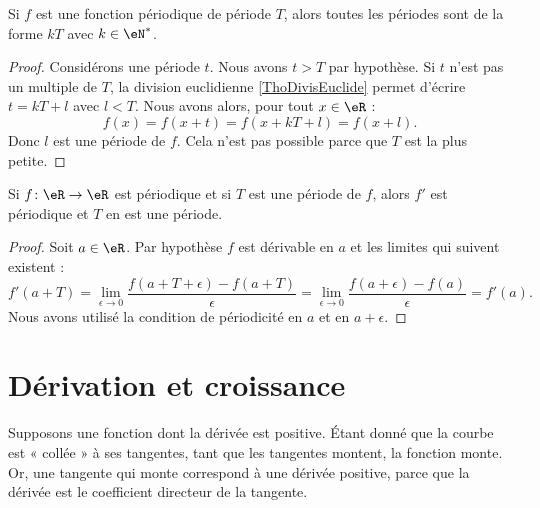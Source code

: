 \begin{lemma}        \label{LEMooOGFGooCnTDjO}
	Si \( f\) est une fonction périodique de période \( T\), alors toutes les périodes sont de la forme \( kT\) avec \( k\in \eN^*\).
\end{lemma}

\begin{proof}
	Considérons une période \( t\). Nous avons \( t>T\) par hypothèse. Si \( t\) n'est pas un multiple de \( T\), la division euclidienne \ref{ThoDivisEuclide} permet d'écrire \( t=kT+l\) avec \( l<T\). Nous avons alors, pour tout \( x\in \eR\) :
	\begin{equation}
		f(x)=f(x+t)=f(x+kT+l)=f(x+l).
	\end{equation}
	Donc \( l\) est une période de \( f\). Cela n'est pas possible parce que \( T\) est la plus petite.
\end{proof}

\begin{lemma}       \label{LEMooHWQYooXcNLts}
	Si \( f\colon \eR\to \eR\) est périodique et si \( T\) est une période de \( f\), alors \( f'\) est périodique et \( T\) en est une période.
\end{lemma}

\begin{proof}
	Soit \( a\in \eR\). Par hypothèse \( f\) est dérivable en \( a\) et les limites qui suivent existent :
	\begin{equation}
		f'(a+T)=\lim_{\epsilon\to 0}\frac{ f(a+T+\epsilon)-f(a+T) }{ \epsilon }=\lim_{\epsilon\to 0}\frac{ f(a+\epsilon)-f(a) }{ \epsilon }=f'(a).
	\end{equation}
	Nous avons utilisé la condition de périodicité en \( a\) et en \( a+\epsilon\).
\end{proof}

\section{Dérivation et croissance}

Supposons une fonction dont la dérivée est positive. Étant donné que la courbe est « collée » à ses tangentes, tant que les tangentes montent, la fonction monte. Or, une tangente qui monte correspond à une dérivée positive, parce que la dérivée est le coefficient directeur de la tangente.


